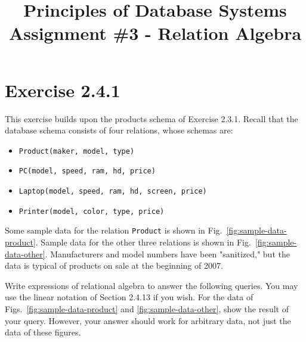 \documentclass{cshwk}
\title{Principles of Database Systems\\Assignment \#3 - Relation Algebra}
\begin{document}
\maketitle


\section{Exercise 2.4.1}

This exercise builds upon the products schema of Exercise
2.3.1. Recall that the database schema consists of four relations, whose schemas are:
\begin{itemize}
    \item \texttt{Product(maker, model, type)}
    \item \texttt{PC(model, speed, ram, hd, price)}
    \item \texttt{Laptop(model, speed, ram, hd, screen, price)}
    \item \texttt{Printer(model, color, type, price)}
\end{itemize}


Some sample data for the relation \texttt{Product} is shown in Fig.~\ref{fig:sample-data-product}. Sample data for the other three relations is shown in Fig.~\ref{fig:sample-data-other}. Manufacturers and model numbers have been "sanitized," but the data is typical of products on sale at the beginning of 2007.

Write expressions of relational algebra to answer the following queries. You may use the linear notation of Section 2.4.13 if you wish. For the data of Figs.~\ref{fig:sample-data-product} and \ref{fig:sample-data-other}, show the result of your query. However, your answer should work for arbitrary data, not just the data of these figures.
\end{document}
